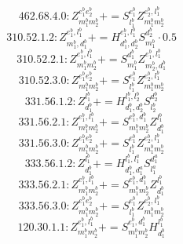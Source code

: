 \documentclass[letterpaper,10pt,fleqn,leqno,onecolumn]{article}
\begin{document}
\begin{equation} \;\;\;\;\;\;  462.68.4.0: Z^{e_{1}^{b}e_{2}^{b}}_{m_{1}^{b}m_{2}^{b}}+=S^{e_{1}^{b}}_{l_{1}^{b}}Z^{e_{2}^{b},l_{1}^{b}}_{m_{1}^{b}m_{2}^{b}} \end{equation}
\begin{equation} \;\;\;\;\;\;  310.52.1.2: Z^{e_{1}^{b},l_{1}^{b}}_{m_{1}^{b},d_{1}^{b}}+=H^{e_{1}^{b},l_{1}^{b}}_{d_{1}^{b},d_{2}^{b}}S^{d_{2}^{b}}_{m_{1}^{b}}\cdot 0.5 \end{equation}
\begin{equation} \;\;\;\;\;\;  310.52.2.1: Z^{e_{1}^{b},l_{1}^{b}}_{m_{1}^{b}m_{2}^{b}}+=S^{d_{1}^{b}}_{m_{1}^{b}}Z^{e_{1}^{b},l_{1}^{b}}_{m_{2}^{b},d_{1}^{b}} \end{equation}
\begin{equation} \;\;\;\;\;\;  310.52.3.0: Z^{e_{1}^{b}e_{2}^{b}}_{m_{1}^{b}m_{2}^{b}}+=S^{e_{1}^{b}}_{l_{1}^{b}}Z^{e_{2}^{b},l_{1}^{b}}_{m_{1}^{b}m_{2}^{b}} \end{equation}
\begin{equation} \;\;\;\;\;\;  331.56.1.2: Z^{l_{1}^{b}}_{d_{1}^{b}}+=H^{l_{1}^{b},l_{2}^{b}}_{d_{1}^{b},d_{2}^{b}}S^{d_{2}^{b}}_{l_{2}^{b}} \end{equation}
\begin{equation} \;\;\;\;\;\;  331.56.2.1: Z^{e_{1}^{b},l_{1}^{b}}_{m_{1}^{b}m_{2}^{b}}+=S^{e_{1}^{b},d_{1}^{b}}_{m_{1}^{b}m_{2}^{b}}Z^{l_{1}^{b}}_{d_{1}^{b}} \end{equation}
\begin{equation} \;\;\;\;\;\;  331.56.3.0: Z^{e_{1}^{b}e_{2}^{b}}_{m_{1}^{b}m_{2}^{b}}+=S^{e_{1}^{b}}_{l_{1}^{b}}Z^{e_{2}^{b},l_{1}^{b}}_{m_{1}^{b}m_{2}^{b}} \end{equation}
\begin{equation} \;\;\;\;\;\;  333.56.1.2: Z^{l_{1}^{b}}_{d_{1}^{b}}+=H^{l_{1}^{b},l_{1}^{a}}_{d_{1}^{b},d_{1}^{a}}S^{d_{1}^{a}}_{l_{1}^{a}} \end{equation}
\begin{equation} \;\;\;\;\;\;  333.56.2.1: Z^{e_{1}^{b},l_{1}^{b}}_{m_{1}^{b}m_{2}^{b}}+=S^{e_{1}^{b},d_{1}^{b}}_{m_{1}^{b}m_{2}^{b}}Z^{l_{1}^{b}}_{d_{1}^{b}} \end{equation}
\begin{equation} \;\;\;\;\;\;  333.56.3.0: Z^{e_{1}^{b}e_{2}^{b}}_{m_{1}^{b}m_{2}^{b}}+=S^{e_{1}^{b}}_{l_{1}^{b}}Z^{e_{2}^{b},l_{1}^{b}}_{m_{1}^{b}m_{2}^{b}} \end{equation}
\begin{equation} \;\;\;\;\;\;  120.30.1.1: Z^{e_{1}^{b},l_{1}^{b}}_{m_{1}^{b}m_{2}^{b}}+=S^{e_{1}^{b},d_{1}^{b}}_{m_{1}^{b}m_{2}^{b}}H^{l_{1}^{b}}_{d_{1}^{b}} \end{equation}
\end{document}
